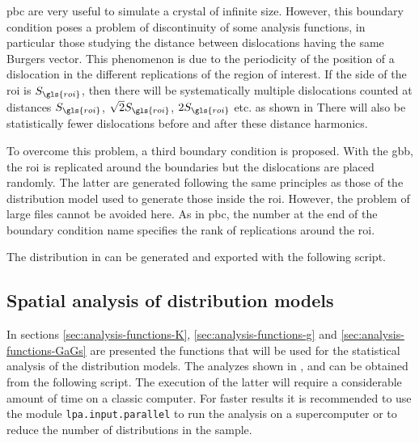 \gls{pbc} are very useful to simulate a crystal of infinite size.
However, this boundary condition poses a problem of discontinuity of some analysis functions, in particular those studying the distance between dislocations having the same Burgers vector.
This phenomenon is due to the periodicity of the position of a dislocation in the different replications of the region of interest.
If the side of the \gls{roi} is \( S_{\gls{roi}} \), then there will be systematically multiple dislocations counted at distances \( S_{\gls{roi}} \), \( \textstyle \sqrt{2} S_{\gls{roi}} \), \( 2 S_{\gls{roi}} \) etc. as shown in 
There will also be statistically fewer dislocations before and after these distance harmonics.

\bigskip

To overcome this problem, a third boundary condition is proposed.
With the \gls{gbb}, the \gls{roi} is replicated around the boundaries but the dislocations are placed randomly.
The latter are generated following the same principles as those of the distribution model used to generate those inside the \gls{roi}.
However, the problem of large files cannot be avoided here.
As in \gls{pbc}, the number at the end of the boundary condition name specifies the rank of replications around the \gls{roi}.

%
%

\bigskip \bigskip

The distribution in  can be generated and exported with the following script.

\medskip


\newpage

\subsection{Spatial analysis of distribution models}\label{sec:analysis-functions}

In sections \ref{sec:analysis-functions-K}, \ref{sec:analysis-functions-g} and \ref{sec:analysis-functions-GaGs} are presented the functions that will be used for the statistical analysis of the distribution models.
The analyzes shown in ,  and  can be obtained from the following script.
The execution of the latter will require a considerable amount of time on a classic computer.
For faster results it is recommended to use the module \texttt{lpa.input.parallel} to run the analysis on a supercomputer or to reduce the number of distributions in the sample.

